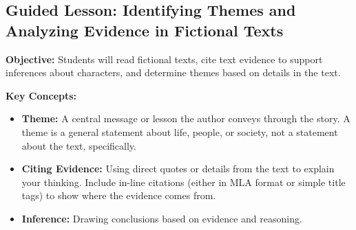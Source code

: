 \documentclass[12pt]{article}
\begin{document}
\subsection*{Guided Lesson: Identifying Themes and Analyzing Evidence in Fictional Texts}
\onehalfspacing

\begin{tcolorbox}[colframe=black!40, colback=gray!5, 
coltitle=black, colbacktitle=black!20, fonttitle=\bfseries\Large, 
title=Learning Objective, halign title=center, left=5pt, right=5pt, top=5pt, bottom=15pt]
\textbf{Objective:} Students will read fictional texts, cite text evidence to support inferences about characters, and determine themes based on details in the text.
\end{tcolorbox}

\vspace{1em}

\begin{tcolorbox}[colframe=black!60, colback=white, 
coltitle=black, colbacktitle=black!15, fonttitle=\bfseries\Large, 
title=Key Concepts and Vocabulary, halign title=center, left=10pt, right=10pt, top=10pt, bottom=15pt]
\textbf{Key Concepts:}
\begin{itemize}
    \item \textbf{Theme:} A central message or lesson the author conveys through the story. A theme is a general statement about life, people, or society, not a statement about the text, specifically.
    \item \textbf{Citing Evidence:} Using direct quotes or details from the text to explain your thinking. Include in-line citations (either in MLA format or simple title tags) to show where the evidence comes from.
    \item \textbf{Inference:} Drawing conclusions based on evidence and reasoning.
\end{itemize}
\end{tcolorbox}

\vspace{1em}
\end{document}

